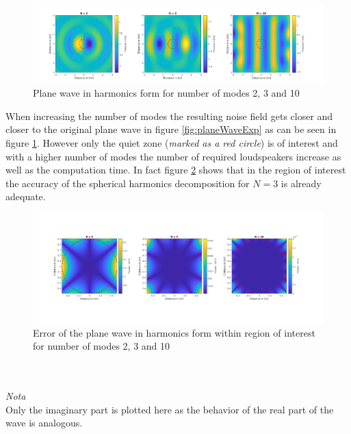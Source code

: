 \begin{figure}[H]
    \centerline{\includegraphics[width=180mm,keepaspectratio]{LaTeX/images/plots/Plane_wave_harmonics_form.png}}
    \caption{Plane wave in harmonics form for number of modes 2, 3 and 10}
    \label{fig:planeWaveHarmonics}
\end{figure}

When increasing the number of modes the resulting noise field gets closer and closer to the original plane wave in figure \ref{fig:planeWaveExp} as can be seen in figure \ref{fig:planeWaveHarmonics}. However only the quiet zone (\textit{marked as a red circle}) is of interest and with a higher number of modes the number of required loudspeakers increase as well as the computation time. In fact figure \ref{fig:planeWaveHarmonicsError} shows that in the region of interest the accuracy of the spherical harmonics decomposition for $N = 3$ is already adequate.
\begin{figure}[H]
    \centerline{\includegraphics[width=180mm,keepaspectratio]{LaTeX/images/plots/Plane_wave_harmonics_form_Error.png}}
    \caption{Error of the plane wave in harmonics form within region of interest for number of modes 2, 3 and 10}
    \label{fig:planeWaveHarmonicsError}
\end{figure}
\\
\\
\textit{Nota}\\
Only the imaginary part is plotted here as the behavior of the real part of the wave is analogous.
